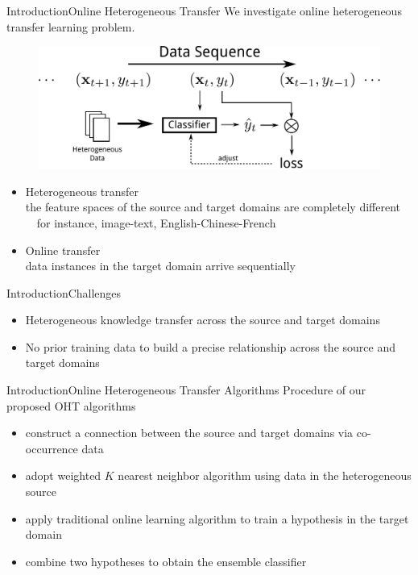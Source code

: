 \documentclass{beamer}
\begin{document}
\begin{frame}{Introduction}{Online Heterogeneous Transfer}
We investigate online heterogeneous transfer learning problem.
\begin{figure}
\centering
\includegraphics[height=0.25\textwidth]{problem.pdf}
\end{figure}
\begin{itemize}
\item
Heterogeneous transfer
\\
the feature spaces of the source and target domains are completely different
\\
~~for instance, image-text, English-Chinese-French
\item
Online transfer
\\
data instances in the target domain arrive sequentially
\end{itemize}
\end{frame}

\begin{frame}{Introduction}{Challenges}
\begin{itemize}
\item
Heterogeneous knowledge transfer across the source and target domains
\item
No prior training data to build a precise relationship across the source and target domains
\end{itemize}
\end{frame}

\begin{frame}{Introduction}{Online Heterogeneous Transfer Algorithms}
Procedure of our proposed OHT algorithms
\begin{itemize}
\item
construct a connection between the source and target domains via co-occurrence data
\item
adopt weighted $K$ nearest neighbor algorithm using data in the heterogeneous source
\item
apply traditional online learning algorithm to train a hypothesis in the target domain 
\item
combine two hypotheses to obtain the ensemble classifier
\end{itemize}
\end{frame}
\end{document}
